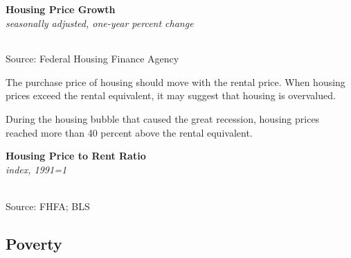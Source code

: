 \documentclass{report}
\makeatletter
\newcommand{\tbllink}[1]{\href{https://raw.githubusercontent.com/bdecon/US-chartbook/master/chartbook/data/#1}{\faTable}}
\newcommand*\short[1]{\expandafter\@gobbletwo\number\numexpr#1\relax}
\newcommand{\shdateaxisticks}{
		date coordinates in=x, axis line style={draw=none},
		xmax={2022-03-15},
		max space between ticks=40,	    
		xtick={{1990-01-01}, {1995-01-01}, {2000-01-01}, 
			{2005-01-01}, {2010-01-01}, {2015-01-01}, {2020-01-01}},
		minor xtick={},
		enlarge y limits={0.06}, enlarge x limits={0.01},
		}
\newcommand{\bbar}[2]{extra #1 ticks = {{#2}}, extra #1 tick labels = ,
		extra #1 tick style = {grid=major, grid style={thick, black!25}},}
\newcommand{\stdline}[4]{\addplot[very thick, no markers, color=#1] 
		table [x=#2, y=#3, col sep=comma] {#4};	}
\newcommand{\rebars}{
		\fill[color=black!10] (axis cs:{2007-12-01},\pgfkeysvalueof{/pgfplots/ymin}) rectangle 
			(axis cs:{2009-07-01}, \pgfkeysvalueof{/pgfplots/ymax});
		\fill[color=black!10] (axis cs:{2001-03-01},\pgfkeysvalueof{/pgfplots/ymin}) rectangle 
			(axis cs:{2001-11-01}, \pgfkeysvalueof{/pgfplots/ymax});
		\fill[color=black!10] (axis cs:{2020-02-01},\pgfkeysvalueof{/pgfplots/ymin}) rectangle 
			(axis cs:{2020-05-01}, \pgfkeysvalueof{/pgfplots/ymax});}
\makeatother
\begin{document}
{\begin{minipage}{0.76\textwidth}
\normalsize{\textbf{Housing Price Growth}}\\
\footnotesize{\textit{seasonally adjusted, one-year percent change}}\\
\hspace*{-3mm} \noindent {} \setlength{\tabcolsep}{2.1pt} \color{black!90}
		{\renewcommand{\arraystretch}{1.45}
		 \begin{tabular}{p{25mm} R{8mm} R{8mm} R{8mm} R{8mm} R{8mm} R{8mm} R{8mm} R{12.0mm} R{10.8mm}}
			  \hline
		\end{tabular}}
		
	\vspace{-2mm}
\footnotesize{Source: Federal Housing Finance Agency} \hfill \tbllink{hpi.csv}
\end{minipage}
\vspace{3mm}

\begin{minipage}{0.33\textwidth}
\small The purchase price of housing should move with the rental price. When housing prices exceed the rental equivalent, it may suggest that housing is overvalued. 

During the housing bubble that caused the great recession, housing prices reached more than 40 percent above the rental equivalent. 
\end{minipage}\hspace{8mm}
\begin{minipage}{0.37\textwidth}
\normalsize \textbf{Housing Price to Rent Ratio}\\
\footnotesize{\textit{index, 1991=1}}\\
\hspace*{-2mm} \\
\footnotesize{Source: FHFA; BLS} \hfill \tbllink{hpi_rent_ratio.csv} 
\end{minipage}
\newpage
\begin{minipage}{0.76\textwidth}
\subsection*{Poverty}
\hypertarget{hhpov}{}
\small 


\end{minipage}}
\end{document}
